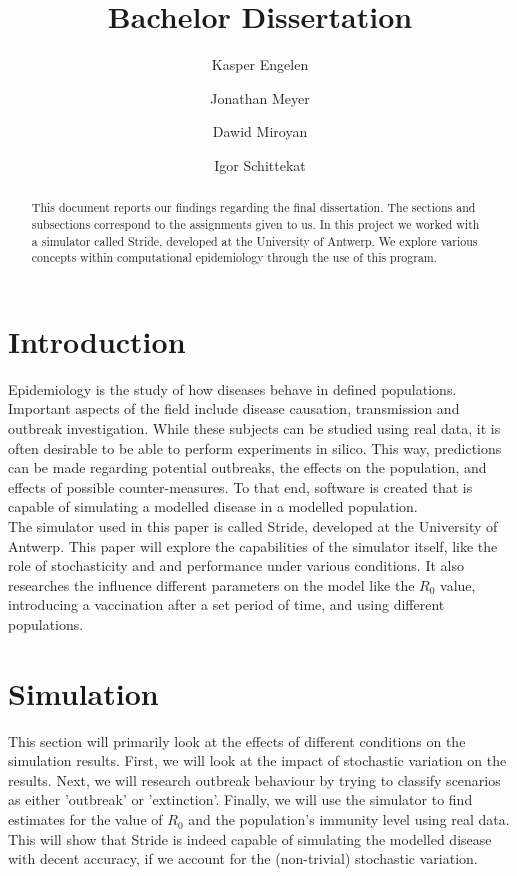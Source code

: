 \documentclass[runningheads]{llncs}
\begin{document}
%
\title{Bachelor Dissertation}
%
%
\author{Kasper Engelen\and
		Jonathan Meyer\and
		Dawid Miroyan\and
		Igor Schittekat}
%
%
%
\maketitle              %
%
\begin{abstract}
This document reports our findings regarding the final dissertation. The sections and subsections correspond to the assignments given to us. In this project we worked with a simulator called Stride, developed at the University of Antwerp. We explore various concepts within computational epidemiology through the use of this program. 

\end{abstract}
%
%
%
\section{Introduction}
Epidemiology is the study of how diseases behave in defined populations. Important aspects of the field include disease causation, transmission and outbreak investigation. While these subjects can be studied using real data, it is often desirable to be able to perform experiments in silico. This way, predictions can be made regarding potential outbreaks, the effects on the population, and effects of possible counter-measures. To that end, software is created that is capable of simulating a modelled disease in a modelled population. \\
The simulator used in this paper is called Stride, developed at the University of Antwerp. This paper will explore the capabilities of the simulator itself, like the role of stochasticity and and performance under various conditions. It also researches the influence different parameters on the model like the $R_0$ value, introducing a vaccination after a set period of time, and using different populations. 

\section{Simulation}
This section will primarily look at the effects of different conditions on the simulation results. First, we will look at the impact of stochastic variation on the results. Next, we will research outbreak behaviour by trying to classify scenarios as either 'outbreak' or 'extinction'. Finally, we will use the simulator to find estimates for the value of $R_0$ and the population's immunity level using real data. This will show that Stride is indeed capable of simulating the modelled disease with decent accuracy, if we account for the (non-trivial) stochastic variation. 
\end{document}
